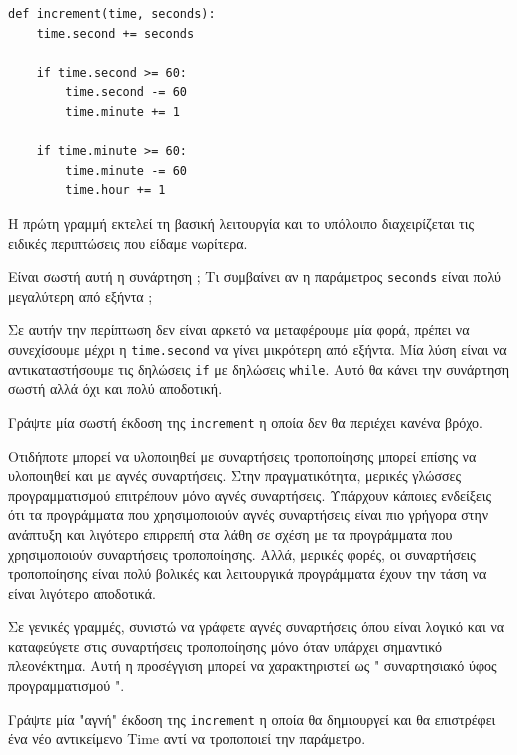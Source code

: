 \documentclass[10pt]{book}
\begin{document}
\begin{verbatim}
def increment(time, seconds):
    time.second += seconds

    if time.second >= 60:
        time.second -= 60
        time.minute += 1

    if time.minute >= 60:
        time.minute -= 60
        time.hour += 1
\end{verbatim}
%
 Η πρώτη γραμμή εκτελεί τη βασική λειτουργία και το υπόλοιπο διαχειρίζεται τις ειδικές περιπτώσεις που είδαμε νωρίτερα.

Είναι σωστή αυτή η συνάρτηση ;   Τι συμβαίνει αν η παράμετρος  {\tt seconds}  είναι πολύ μεγαλύτερη από εξήντα ;

 Σε αυτήν την περίπτωση δεν είναι αρκετό να μεταφέρουμε μία φορά, πρέπει να συνεχίσουμε μέχρι η  {\tt time.second}  να 
γίνει μικρότερη από εξήντα.  Μία λύση είναι να αντικαταστήσουμε τις δηλώσεις  {\tt if}  με δηλώσεις  {\tt while}.   Αυτό θα κάνει την συνάρτηση σωστή αλλά όχι και πολύ αποδοτική.

\begin{exercise}

Γράψτε μία σωστή έκδοση της  {\tt increment}  η οποία δεν θα περιέχει κανένα βρόχο.

Οτιδήποτε μπορεί να υλοποιηθεί με συναρτήσεις τροποποίησης μπορεί επίσης να υλοποιηθεί και με αγνές συναρτήσεις.  Στην πραγματικότητα, μερικές γλώσσες προγραμματισμού επιτρέπουν μόνο αγνές συναρτήσεις.  Υπάρχουν κάποιες ενδείξεις ότι τα προγράμματα που χρησιμοποιούν αγνές συναρτήσεις είναι πιο γρήγορα στην ανάπτυξη και λιγότερο επιρρεπή στα λάθη σε σχέση με τα προγράμματα που χρησιμοποιούν συναρτήσεις τροποποίησης.  Αλλά, μερικές φορές, οι συναρτήσεις τροποποίησης είναι πολύ βολικές και λειτουργικά προγράμματα έχουν την τάση να είναι λιγότερο αποδοτικά.

Σε γενικές γραμμές, συνιστώ να γράφετε αγνές συναρτήσεις όπου είναι λογικό και να καταφεύγετε στις συναρτήσεις τροποποίησης μόνο όταν υπάρχει σημαντικό πλεονέκτημα.  Αυτή η προσέγγιση μπορεί να χαρακτηριστεί ως  " συναρτησιακό ύφος  προγραμματισμού ".  
\end{exercise}


\begin{exercise}

Γράψτε μία  "αγνή"  έκδοση της  {\tt increment}  η οποία θα δημιουργεί και θα επιστρέφει ένα νέο 
αντικείμενο  Time  αντί να τροποποιεί την παράμετρο.
\end{exercise}
\end{document}
